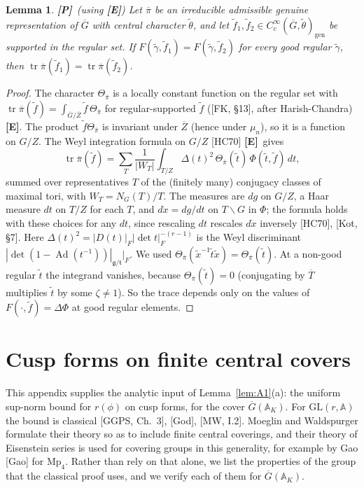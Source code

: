 \documentclass[12pt]{article}
\newcommand{\ov}[1]{\overline{#1}}
\newcommand{\A}{\mathbb{A}}
\newcommand{\gen}{\mathrm{gen}}
\newcommand{\tr}{\operatorname{tr}}
\newcommand{\Ad}{\operatorname{Ad}}
\newcommand{\GL}{\mathrm{GL}}
\newcommand{\Gb}{\ov{G}}
\newcommand{\Zb}{\ov{Z}}
\newcommand{\pib}{\ov{\pi}}
\newcommand{\Tb}{\ov{T}}
\newcommand{\Pv}{\textbf{[P]}}
\newcommand{\Ev}{\textbf{[E]}}
\theoremstyle{plain}
\newtheorem{lemma}[theorem]{Lemma}
\theoremstyle{definition}
\begin{document}
\begin{lemma}\label{lem:traceOI}\Pv\ (using \Ev)
Let $\pib$ be an irreducible admissible genuine representation of $\Gb$ with central character $\tilde\theta$, and let $\tilde f_1,\tilde f_2\in C_c^\infty(\Gb,\tilde\theta)_\gen$ be supported in the regular set. If $F(\tilde\gamma,\tilde f_1)=F(\tilde\gamma,\tilde f_2)$ for every good regular $\tilde\gamma$, then $\tr\pib(\tilde f_1)=\tr\pib(\tilde f_2)$.
\end{lemma}
\begin{proof}
The character $\Theta_{\pib}$ is a locally constant function on the regular set with $\tr\pib(\tilde f)=\int_{\Gb/\Zb}\tilde f\,\Theta_{\pib}$ for regular-supported $\tilde f$ ([FK, \S13], after Harish-Chandra) \Ev. The product $\tilde f\Theta_{\pib}$ is invariant under $\Zb$ (hence under $\mu_n$), so it is a function on $G/Z$. The Weyl integration formula on $G/Z$ [HC70] \Ev\ gives
\[ \tr\pib(\tilde f)=\sum_{T}\frac1{|W_T|}\int_{T/Z}\Delta(t)^2\,\Theta_{\pib}(\tilde t)\,\Phi(\tilde t,\tilde f)\,dt, \]
summed over representatives $T$ of the (finitely many) conjugacy classes of maximal tori, with $W_T=N_G(T)/T$. The measures are $dg$ on $G/Z$, a Haar measure $dt$ on $T/Z$ for each $T$, and $d\dot x=dg/dt$ on $T\backslash G$ in $\Phi$; the formula holds with these choices for any $dt$, since rescaling $dt$ rescales $d\dot x$ inversely [HC70], [Kot, \S7]. Here $\Delta(t)^2=|D(t)|_F|\det t|_F^{-(r-1)}$ is the Weyl discriminant $|\det(1-\Ad(t^{-1}))|_{\mathfrak g/\mathfrak t}|_F$. We used $\Theta_{\pib}(\tilde x^{-1}\tilde t\tilde x)=\Theta_{\pib}(\tilde t)$. At a non-good regular $\tilde t$ the integrand vanishes, because $\Theta_{\pib}(\tilde t)=0$ (conjugating by $\Tb$ multiplies $\tilde t$ by some $\zeta\ne1$). So the trace depends only on the values of $F(\cdot,\tilde f)=\Delta\Phi$ at good regular elements.
\end{proof}


\section{Cusp forms on finite central covers}\label{app:cusp}
This appendix supplies the analytic input of Lemma~\ref{lem:A1}(a): the uniform sup-norm bound for $r(\phi)$ on cusp forms, for the cover $\Gb(\A_K)$. For $\GL(r,\A)$ the bound is classical [GGPS, Ch.~3], [God], [MW, I.2]. Moeglin and Waldspurger formulate their theory so as to include finite central coverings, and their theory of Eisenstein series is used for covering groups in this generality, for example by Gao [Gao] for $\mathrm{Mp}_4$. Rather than rely on that alone, we list the properties of the group that the classical proof uses, and we verify each of them for $\Gb(\A_K)$.
\end{document}
